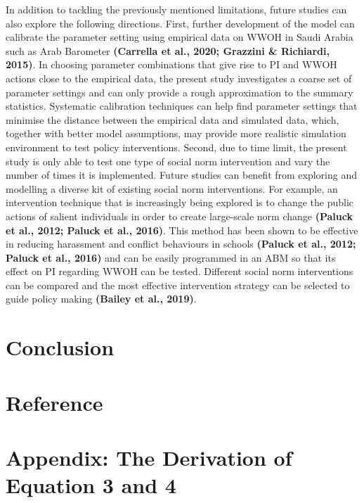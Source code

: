\documentclass[
  11pt,
]{article}
\begin{document}
In addition to tackling the previously mentioned limitations, future
studies can also explore the following directions. First, further
development of the model can calibrate the parameter setting using
empirical data on WWOH in Saudi Arabia such as Arab Barometer
\textbf{(Carrella et al., 2020; Grazzini \& Richiardi, 2015)}. In
choosing parameter combinations that give rise to PI and WWOH actions
close to the empirical data, the present study investigates a coarse set
of parameter settings and can only provide a rough approximation to the
summary statistics. Systematic calibration techniques can help find
parameter settings that minimise the distance between the empirical data
and simulated data, which, together with better model assumptions, may
provide more realistic simulation environment to test policy
interventions. Second, due to time limit, the present study is only able
to test one type of social norm intervention and vary the number of
times it is implemented. Future studies can benefit from exploring and
modelling a diverse kit of existing social norm interventions. For
example, an intervention technique that is increasingly being explored
is to change the public actions of salient individuals in order to
create large-scale norm change \textbf{(Paluck et al., 2012; Paluck et
al., 2016)}. This method has been shown to be effective in reducing
harassment and conflict behaviours in schools \textbf{(Paluck et al.,
2012; Paluck et al., 2016)} and can be easily programmed in an ABM so
that its effect on PI regarding WWOH can be tested. Different social
norm interventions can be compared and the most effective intervention
strategy can be selected to guide policy making \textbf{(Bailey et al.,
2019)}.

\hypertarget{conclusion}{%
\section{Conclusion}\label{conclusion}}

\newpage

\hypertarget{reference}{%
\section*{Reference}\label{reference}}

\newpage

\hypertarget{appendix-the-derivation-of-equation-3-and-4}{%
\section*{Appendix: The Derivation of Equation 3 and
4}\label{appendix-the-derivation-of-equation-3-and-4}}
\end{document}
